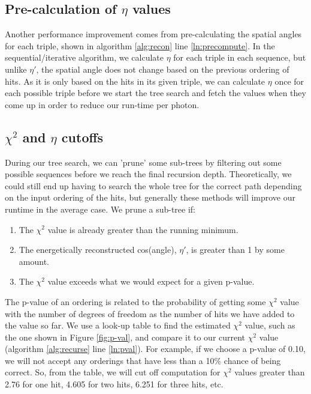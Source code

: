 \subsection{Pre-calculation of $\eta$ values}
Another performance improvement comes from pre-calculating the spatial angles for each triple, shown in algorithm \ref{alg:recon} line \ref{ln:precompute}. In the sequential/iterative algorithm, we calculate $\eta$ for each triple in each sequence, but unlike $\eta'$, the spatial angle does not change based on the previous ordering of hits. As it is only based on the hits in its given triple, we can calculate $\eta$ once for each possible triple before we start the tree search and fetch the values when they come up in order to reduce our run-time per photon.

\subsection{$\chi^2$ and $\eta$ cutoffs}

During our tree search, we can 'prune' some sub-trees by filtering out some possible sequences before we reach the final recursion depth. Theoretically, we could still end up having to search the whole tree for the correct path depending on the input ordering of the hits, but generally these methods will improve our runtime in the average case. We prune a sub-tree if:
\begin{enumerate}
    \item The $\chi^2$ value is already greater than the running minimum.
    \item The energetically reconstructed cos(angle), $\eta'$, is greater than 1 by some amount.
    \item The $\chi^2$ value exceeds what we would expect for a given p-value.
\end{enumerate}
The p-value of an ordering is related to the probability of getting some $\chi^2$ value with the number of degrees of freedom as the number of hits we have added to the value so far. We use a look-up table to find the estimated $\chi^2$ value, such as the one shown in Figure \ref{fig:p-val}, and compare it to our current $\chi^2$ value (algorithm \ref{alg:recurse} line \ref{ln:pval}). For example, if we choose a p-value of 0.10, we will not accept any orderings that have less than a 10\% chance of being correct. So, from the table, we will cut off computation for $\chi^2$ values greater than 2.76 for one hit, 4.605 for two hits, 6.251 for three hits, etc.

